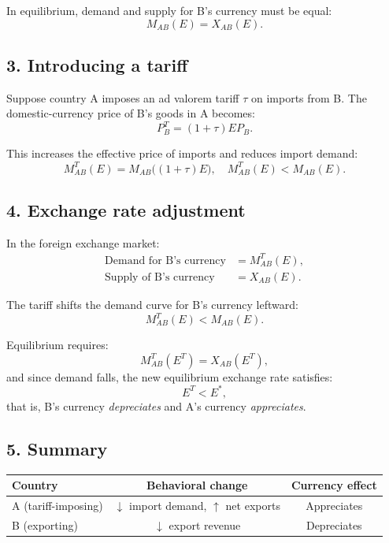 \documentclass[11pt]{article}
\begin{document}
In equilibrium, demand and supply for B's currency must be equal:
\[
M_{AB}(E) = X_{AB}(E).
\]

\subsection*{3. Introducing a tariff}

Suppose country A imposes an ad valorem tariff \( \tau \) on imports from B.  
The domestic-currency price of B's goods in A becomes:
\[
P_B^T = (1+\tau) E P_B.
\]

This increases the effective price of imports and reduces import demand:
\[
M_{AB}^T(E) = M_{AB}\big( (1+\tau) E \big), \quad
M_{AB}^T(E) < M_{AB}(E).
\]

\subsection*{4. Exchange rate adjustment}

In the foreign exchange market:
\begin{align*}
\text{Demand for B's currency} &= M_{AB}^T(E), \\
\text{Supply of B's currency} &= X_{AB}(E).
\end{align*}

The tariff shifts the demand curve for B's currency leftward:
\[
M_{AB}^T(E) < M_{AB}(E).
\]

Equilibrium requires:
\[
M_{AB}^T(E^T) = X_{AB}(E^T),
\]
and since demand falls, the new equilibrium exchange rate satisfies:
\[
E^T < E^*,
\]
that is, B's currency \emph{depreciates} and A's currency \emph{appreciates}.

\subsection*{5. Summary}

\begin{center}
\begin{tabular}{lcc}
\hline
Country & Behavioral change & Currency effect \\
\hline
A (tariff-imposing) & $\downarrow$ import demand, $\uparrow$ net exports & Appreciates \\
B (exporting) & $\downarrow$ export revenue & Depreciates \\
\hline
\end{tabular}
\end{center}
\end{document}
